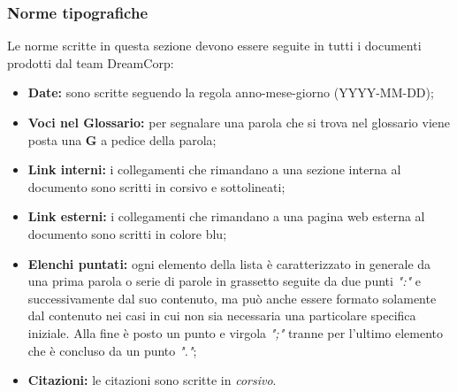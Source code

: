 		\subsubsection{Norme tipografiche}
			Le norme scritte in questa sezione devono essere seguite in tutti i documenti prodotti dal team DreamCorp:
			\begin{itemize}
				\item \textbf{Date:} sono scritte seguendo la regola anno-mese-giorno (YYYY-MM-DD);
				\item \textbf{Voci nel Glossario:} per segnalare una parola che si trova nel glossario viene posta una \textbf{G} a pedice della parola;
				\item \textbf{Link interni:} i collegamenti che rimandano a una sezione interna al documento sono scritti in corsivo e sottolineati;
				\item \textbf{Link esterni:} i collegamenti che rimandano a una pagina web esterna al documento sono scritti in colore blu;
				\item \textbf{Elenchi puntati:} ogni elemento della lista è caratterizzato in generale da una prima parola o serie di parole in grassetto seguite da due punti \textit{":"} e successivamente dal suo contenuto, ma può anche essere formato solamente dal contenuto nei casi in cui non sia necessaria una particolare specifica iniziale. Alla fine è posto un punto e virgola \textit{";"} tranne per l'ultimo elemento che è concluso da un punto \textit{"."};
				\item \textbf{Citazioni:} le citazioni sono scritte in \textit{corsivo}.
			\end{itemize}
